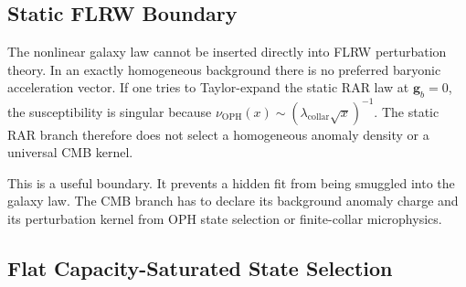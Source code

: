 \documentclass[11pt]{article}
\newcommand{\OPH}{\mathrm{OPH}}
\newcommand{\lambdac}{\lambda_{\mathrm{collar}}}
\begin{document}
\subsection{Static FLRW Boundary}

The nonlinear galaxy law cannot be inserted directly into FLRW perturbation
theory.  In an exactly homogeneous background there is no preferred baryonic
acceleration vector.  If one tries to Taylor-expand the static RAR law at
\(\mathbf g_b=0\), the susceptibility is singular because
\(\nu_{\OPH}(x)\sim(\lambdac\sqrt{x})^{-1}\).  The static RAR branch therefore
does not select a homogeneous anomaly density or a universal CMB kernel.

This is a useful boundary.  It prevents a hidden fit from being smuggled into
the galaxy law.  The CMB branch has to declare its background anomaly charge
and its perturbation kernel from OPH state selection or finite-collar
microphysics.

\subsection{Flat Capacity-Saturated State Selection}
\end{document}
